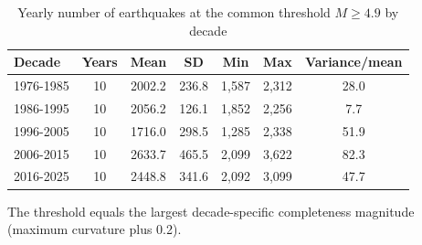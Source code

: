 \begin{table}[t]
\centering
\begin{threeparttable}
\caption{Yearly number of earthquakes at the common threshold $M\geq 4.9$ by decade}
\label{tab:counts_common}
\begin{tabular}{lcccccc}
\toprule
Decade & Years & Mean & SD & Min & Max & Variance/mean \\
\midrule
1976-1985 & 10 & 2002.2 & 236.8 & 1,587 & 2,312 & 28.0 \\
1986-1995 & 10 & 2056.2 & 126.1 & 1,852 & 2,256 & 7.7 \\
1996-2005 & 10 & 1716.0 & 298.5 & 1,285 & 2,338 & 51.9 \\
2006-2015 & 10 & 2633.7 & 465.5 & 2,099 & 3,622 & 82.3 \\
2016-2025 & 10 & 2448.8 & 341.6 & 2,092 & 3,099 & 47.7 \\
\bottomrule
\end{tabular}
\begin{tablenotes}[flushleft]
\footnotesize
\item The threshold equals the largest decade-specific completeness magnitude (maximum curvature plus 0.2).
\end{tablenotes}
\end{threeparttable}
\end{table}

